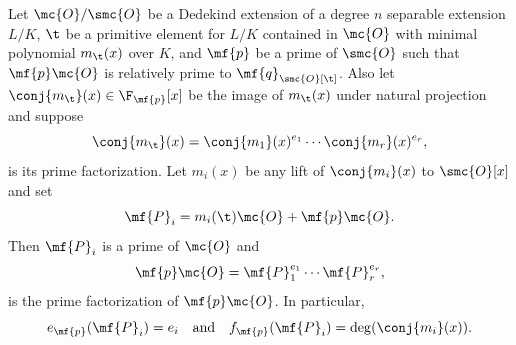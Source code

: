 \documentclass[12pt]{article}
\begin{document}
      \begin{theorem*}
        Let \(\mc{O}/\smc{O}\) be a Dedekind extension of a degree \(n\) separable extension \(L/K\), \(\t\) be a primitive element for \(L/K\) contained in \(\mc{O}\) with minimal polynomial \(m_{\t}(x)\) over \(K\), and \(\mf{p}\) be a prime of \(\smc{O}\) such that \(\mf{p}\mc{O}\) is relatively prime to \(\mf{q}_{\smc{O}[\t]}\). Also let \(\conj{m_{\t}}(x) \in \F_{\mf{p}}[x]\) be the image of \(m_{\t}(x)\) under natural projection and suppose
        \[
          \conj{m_{\t}}(x) = \conj{m_{1}}(x)^{e_{1}} \cdots \conj{m_{r}}(x)^{e_{r}},
        \]
        is its prime factorization. Let \(m_{i}(x)\) be any lift of \(\conj{m_{i}}(x)\) to \(\smc{O}[x]\) and set
        \[
          \mf{P}_{i} = m_{i}(\t)\mc{O}+\mf{p}\mc{O}.
        \]
        Then \(\mf{P}_{i}\) is a prime of \(\mc{O}\) and
        \[
          \mf{p}\mc{O} = \mf{P}_{1}^{e_{1}} \cdots \mf{P}_{r}^{e_{r}},
        \]
        is the prime factorization of \(\mf{p}\mc{O}\). In particular,
        \[
          e_{\mf{p}}(\mf{P}_{i}) = e_{i} \quad \text{and} \quad f_{\mf{p}}(\mf{P}_{i}) = \deg(\conj{m_{i}}(x)).
        \]
      \end{theorem*}
\end{document}
